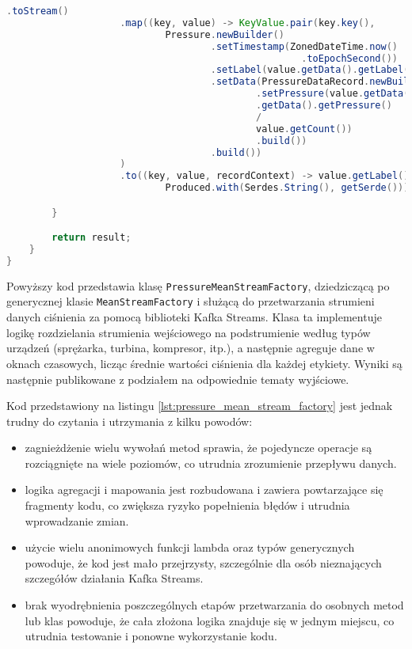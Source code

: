 \begin{lstlisting}[caption={Implementacja w klasie PressureMeanStreamFactory}, label={lst:pressure_mean_stream_factory},language=Java]
                    .toStream()
                    .map((key, value) -> KeyValue.pair(key.key(),
                            Pressure.newBuilder()
                                    .setTimestamp(ZonedDateTime.now()
                                                    .toEpochSecond())
                                    .setLabel(value.getData().getLabel())
                                    .setData(PressureDataRecord.newBuilder()
                                            .setPressure(value.getData()
                                            .getData().getPressure() 
                                            / 
                                            value.getCount())
                                            .build())
                                    .build())
                    )
                    .to((key, value, recordContext) -> value.getLabel().toString() + getOutputTopicsPostfix(),
                            Produced.with(Serdes.String(), getSerde()));

        }

        return result;
    }
}  

\end{lstlisting}

Powyższy kod przedstawia klasę \texttt{PressureMeanStreamFactory}, dziedziczącą po generycznej klasie \texttt{MeanStreamFactory} i służącą do przetwarzania strumieni danych ciśnienia za pomocą biblioteki Kafka Streams. Klasa ta implementuje logikę rozdzielania strumienia wejściowego na podstrumienie według typów urządzeń (sprężarka, turbina, kompresor, itp.), a następnie agreguje dane w oknach czasowych, licząc średnie wartości ciśnienia dla każdej etykiety. Wyniki są następnie publikowane z podziałem na odpowiednie tematy wyjściowe.

\vspace{0.3em}

Kod przedstawiony na listingu \ref{lst:pressure_mean_stream_factory} jest jednak trudny do czytania i utrzymania z kilku powodów:
\begin{itemize}
    \item zagnieżdżenie wielu wywołań metod sprawia, że pojedyncze operacje są rozciągnięte na wiele poziomów, co utrudnia zrozumienie przepływu danych.
    \item logika agregacji i mapowania jest rozbudowana i zawiera powtarzające się fragmenty kodu, co zwiększa ryzyko popełnienia błędów i utrudnia wprowadzanie zmian.
    \item użycie wielu anonimowych funkcji lambda oraz typów generycznych powoduje, że kod jest mało przejrzysty, szczególnie dla osób nieznających szczegółów działania Kafka Streams.
    \item brak wyodrębnienia poszczególnych etapów przetwarzania do osobnych metod lub klas powoduje, że cała złożona logika znajduje się w jednym miejscu, co utrudnia testowanie i ponowne wykorzystanie kodu.
\end{itemize}


